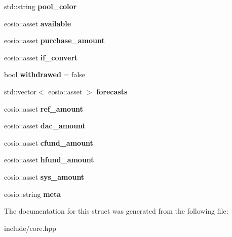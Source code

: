 \begin{DoxyCompactItemize}
\item 
\mbox{\label{structeosio_1_1balance_a40ac6d67666369f291630e98870daed3}} 
std\+::string {\bfseries pool\+\_\+color}
\item 
\mbox{\label{structeosio_1_1balance_a6b80456da79deafb97592839001f9e6a}} 
eosio\+::asset {\bfseries available}
\item 
\mbox{\label{structeosio_1_1balance_a61223315ff49034dd597b5ccfe725183}} 
eosio\+::asset {\bfseries purchase\+\_\+amount}
\item 
\mbox{\label{structeosio_1_1balance_af918ab0e502d49f254aea7e8dc7d2811}} 
eosio\+::asset {\bfseries if\+\_\+convert}
\item 
\mbox{\label{structeosio_1_1balance_afba4dfb4ebe9a129e93b37d6a3907cd7}} 
bool {\bfseries withdrawed} = false
\item 
\mbox{\label{structeosio_1_1balance_afebf2cb5fe118810ab613a08b92f236b}} 
std\+::vector$<$ eosio\+::asset $>$ {\bfseries forecasts}
\item 
\mbox{\label{structeosio_1_1balance_ab04f7ff3b73ba647d8e769206f589722}} 
eosio\+::asset {\bfseries ref\+\_\+amount}
\item 
\mbox{\label{structeosio_1_1balance_af7425e46c6d6e4126f7b688e3eff010d}} 
eosio\+::asset {\bfseries dac\+\_\+amount}
\item 
\mbox{\label{structeosio_1_1balance_af53317ad64d09f3719088a70185e0ba1}} 
eosio\+::asset {\bfseries cfund\+\_\+amount}
\item 
\mbox{\label{structeosio_1_1balance_ab8dac077ff6f7ca6aed57a382a3b5e2f}} 
eosio\+::asset {\bfseries hfund\+\_\+amount}
\item 
\mbox{\label{structeosio_1_1balance_a11e2a26a102b4ddc5a88772fb072167f}} 
eosio\+::asset {\bfseries sys\+\_\+amount}
\item 
\mbox{\label{structeosio_1_1balance_a39120187a8d37fad057699d2d971db5d}} 
eosio\+::string {\bfseries meta}
\end{DoxyCompactItemize}


The documentation for this struct was generated from the following file\+:\begin{DoxyCompactItemize}
\item 
include/core.\+hpp\end{DoxyCompactItemize}
